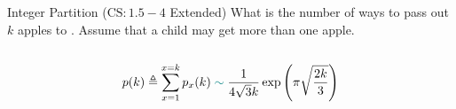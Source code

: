 
\begin{frame}{}
  \begin{exampleblock}{Integer Partition ($\text{CS}: 1.5-4$ Extended)}
    What is the number of ways to pass out $k$  apples to . 
    Assume that a child may get more than one apple.
  \end{exampleblock}

  \pause
  \begin{columns}
  \end{columns}

  \pause
  \vspace{0.80cm}
  \centerline{	\pause \quad {}}

  \pause
  \begin{theorem}
    \[
      p(k) \triangleq \sum_{x=1}^{x=k} p_{x}(k) \;\textcolor{teal}{\sim}\; \frac {1} {4\sqrt{3} k} \exp\left({\pi \sqrt {\frac{2k}{3}}}\right)
    \]
  \end{theorem}
\end{frame}

% 
% 
% 

